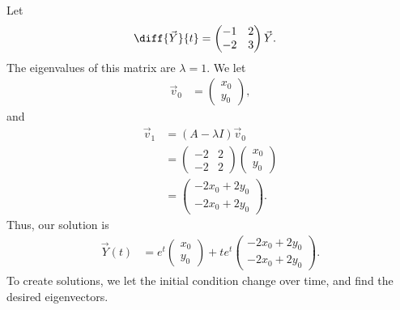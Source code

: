 \documentclass[10pt]{mypackage}
\begin{document}
\begin{example}
  Let
  \begin{align*}
    \diff{\vec{Y}}{t} &= \begin{pmatrix}-1 & 2 \\ -2 & 3\end{pmatrix} \vec{Y}.
  \end{align*}
  The eigenvalues of this matrix are $\lambda = 1$. We let
  \begin{align*}
    \vec{v}_0 &= \begin{pmatrix}x_0\\y_0\end{pmatrix},
  \end{align*}
  and
  \begin{align*}
    \vec{v}_1 &= \left(A - \lambda I\right)\vec{v}_0\\
              &= \begin{pmatrix}-2 & 2 \\ -2 & 2\end{pmatrix} \begin{pmatrix}x_0\\y_0\end{pmatrix}\\
              &= \begin{pmatrix}-2x_0 + 2y_0 \\ -2x_0 + 2y_0\end{pmatrix}.
  \end{align*}
  Thus, our solution is
  \begin{align*}
    \vec{Y}(t) &= e^{t} \begin{pmatrix}x_0\\y_0\end{pmatrix} + te^{t} \begin{pmatrix}-2x_0 + 2y_0\\-2x_0 + 2y_0\end{pmatrix}.
  \end{align*}
  To create solutions, we let the initial condition change over time, and find the desired eigenvectors.\newline


\end{example}
\end{document}
